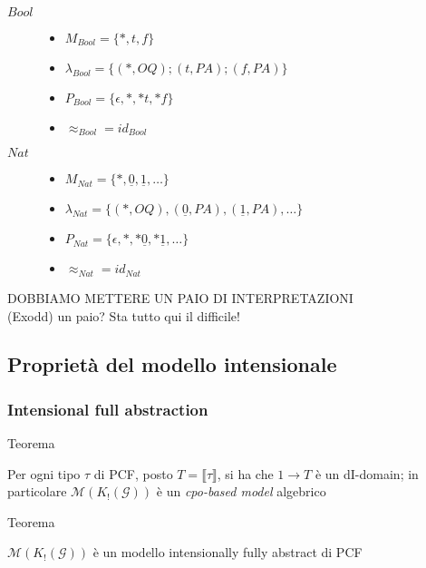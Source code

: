\documentclass{beamer}
\begin{document}
\begin{frame}
	
		
	\begin{example}
		\begin{description}
			\item[$Bool$] \begin{itemize}
			              	\item $M_{Bool}=\{*,t,f\}$
			              	\item $\lambda_{Bool}= \{ (*,OQ) ; (t,PA) ; (f,PA) \}$
			              	\item $P_{Bool}= \{ \epsilon , * ,*t, *f \}$
			              	\item $\approx_{Bool} = id_{Bool}$
			              \end{itemize}

			\item[$Nat$] \begin{itemize}
			              	\item $M_{Nat}=\{ * , \underline{0} , \underline{1} , \dots \}$
			              	\item $\lambda_{Nat}= \{ (*,OQ) , (\underline{0},PA) , (\underline{1},PA) , \dots \}$
			              	\item $P_{Nat}= \{ \epsilon , * , *\underline{0} , *\underline{1} , \dots \}$
											\item $\approx_{Nat} = id_{Nat}$
			              \end{itemize}
		\end{description}

	\end{example}	
	DOBBIAMO METTERE UN PAIO DI INTERPRETAZIONI\\
	(Exodd) un paio? Sta tutto qui il difficile!
	
\end{frame}



\subsection{Proprietà del modello intensionale}

\begin{frame}
	
	\frametitle{Intensional full abstraction}
	
	
	\begin{block}{Teorema}
		
		Per ogni tipo $\tau$ di PCF, posto $T= \llbracket \tau \rrbracket$, si ha che $1 \rightarrow T$ è un dI-domain;
		in particolare $\mathcal{M}(K_! (\mathcal{G}) )$ è un \emph{cpo-based model} algebrico
		
	\end{block}
	
	
	\begin{block}{Teorema}
		
		$\mathcal{M}(K_! (\mathcal{G}) )$ è un modello intensionally fully abstract di PCF
		
	\end{block}
	
	
\end{frame}
\end{document}
